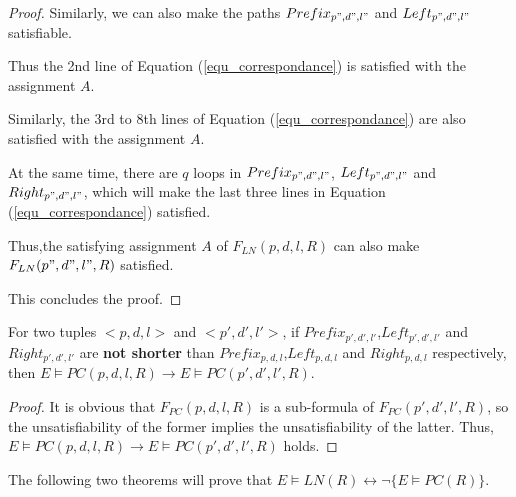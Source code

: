 \documentclass{sig-alternate}
\begin{document}
\begin{proof}
Similarly,
we can also make the paths $Prefix_{p",d",l"}$ and $Left_{p",d",l"}$ satisfiable.

Thus the 2nd line of Equation (\ref{equ_correspondance}) is satisfied with the assignment $A$.

Similarly,
the 3rd to 8th lines of Equation (\ref{equ_correspondance}) are also satisfied with the assignment $A$.

At the same time,
there are $q$ loops in $Prefix_{p",d",l"}$, $Left_{p",d",l"}$ and $Right_{p",d",l"}$,
which will make the last three lines in Equation (\ref{equ_correspondance}) satisfied.

Thus,the satisfying assignment $A$ of $F_{LN}(p,d,l,R)$ can also make $F_{LN}(p",d",l",R)$ satisfied.

This concludes the proof.
\end{proof}

\begin{lemma}[]\label{lemma_pc_long}
For two tuples $<p,d,l>$ and $<p',d',l'>$,
if $Prefix_{p',d',l'}$,$Left_{p',d',l'}$ and $Right_{p',d',l'}$ are \textbf{not shorter} than $Prefix_{p,d,l}$,$Left_{p,d,l}$ and $Right_{p,d,l}$ respectively,
then $E\vDash PC(p,d,l,R)\to E\vDash PC(p',d',l',R)$.
\end{lemma}
\begin{proof}
It is obvious that $F_{PC}(p,d,l,R)$ is a sub-formula of $F_{PC}(p',d',l',R)$,
so the unsatisfiability of the former implies the unsatisfiability of the latter.
Thus,
$E\vDash PC(p,d,l,R)\to E\vDash PC(p',d',l',R)$ holds.
\end{proof}

The following two theorems will prove that $E\vDash LN(R)\leftrightarrow \neg \{E\vDash PC(R)\}$.
\end{document}

